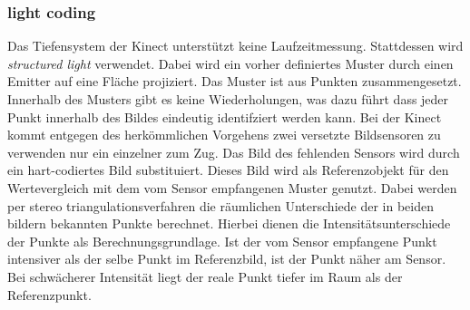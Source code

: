 			\subsubsection{light coding}
			Das Tiefensystem der Kinect unterstützt keine Laufzeitmessung. Stattdessen wird \textit{structured light} verwendet. Dabei wird ein vorher definiertes Muster durch einen Emitter auf eine Fläche projiziert. Das Muster ist aus Punkten zusammengesetzt. Innerhalb des Musters gibt es keine Wiederholungen, was dazu führt dass jeder Punkt innerhalb des Bildes eindeutig identifziert werden kann. Bei der Kinect kommt entgegen des herkömmlichen Vorgehens zwei versetzte Bildsensoren zu verwenden nur ein einzelner zum Zug. Das Bild des fehlenden Sensors wird durch ein hart-codiertes Bild substituiert. Dieses Bild wird als Referenzobjekt für den Wertevergleich mit dem vom Sensor empfangenen Muster genutzt. Dabei werden per stereo triangulationsverfahren die räumlichen Unterschiede der in beiden bildern bekannten Punkte berechnet. Hierbei dienen die Intensitätsunterschiede der Punkte als Berechnungsgrundlage. Ist der vom Sensor empfangene Punkt intensiver als der selbe Punkt im Referenzbild, ist der Punkt näher am Sensor. Bei schwächerer Intensität liegt der reale Punkt tiefer im Raum als der Referenzpunkt.\\
			\cite{kinect-georg}
			\cite{alpha-centauri-ueberlicht}
			\cite{kinect-uug-chem}
			
